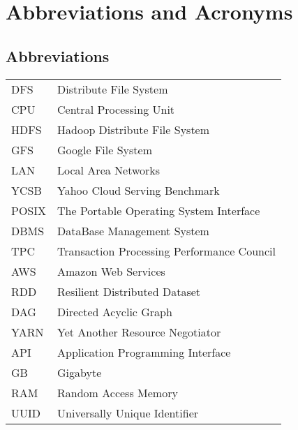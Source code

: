 \chapter*{Abbreviations and Acronyms}



\section*{Abbreviations}

\begin{tabular}{ll}
DFS	   	& Distribute File System \\
CPU  	& Central Processing Unit \\
HDFS         & Hadoop Distribute File System \\
GFS		 & Google File System \\
LAN	   	& Local Area Networks \\
YCSB	 & Yahoo Cloud Serving Benchmark \\
POSIX 	& The Portable Operating System Interface \\
DBMS	& DataBase Management System \\
TPC 		& Transaction Processing Performance Council \\
AWS 	& Amazon Web Services \\
RDD 	& Resilient Distributed Dataset \\
DAG 	& Directed Acyclic Graph \\
YARN 	& Yet Another Resource Negotiator \\
API 		& Application Programming Interface \\
GB 		& Gigabyte  \\
RAM 	& Random Access Memory \\
UUID 	& Universally Unique Identifier \\


\end{tabular}
\clearpage
